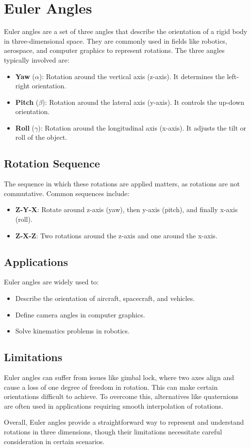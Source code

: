 \section{Euler Angles}
Euler angles are a set of three angles that describe the orientation of a rigid body in three-dimensional space. They are commonly used in fields like robotics, aerospace, and computer graphics to represent rotations. The three angles typically involved are:

\begin{itemize}
	\item \textbf{Yaw} (\(\alpha\)): Rotation around the vertical axis (z-axis). It determines the left-right orientation.
	\item \textbf{Pitch} (\(\beta\)): Rotation around the lateral axis (y-axis). It controls the up-down orientation.
	\item \textbf{Roll} (\(\gamma\)): Rotation around the longitudinal axis (x-axis). It adjusts the tilt or roll of the object.
\end{itemize}

\subsection*{Rotation Sequence}
The sequence in which these rotations are applied matters, as rotations are not commutative. Common sequences include:
\begin{itemize}
	\item \textbf{Z-Y-X}: Rotate around z-axis (yaw), then y-axis (pitch), and finally x-axis (roll).
	\item \textbf{Z-X-Z}: Two rotations around the z-axis and one around the x-axis.
\end{itemize}

\subsection*{Applications}
Euler angles are widely used to:
\begin{itemize}
	\item Describe the orientation of aircraft, spacecraft, and vehicles.
	\item Define camera angles in computer graphics.
	\item Solve kinematics problems in robotics.
\end{itemize}

\subsection*{Limitations}
Euler angles can suffer from issues like gimbal lock, where two axes align and cause a loss of one degree of freedom in rotation. This can make certain orientations difficult to achieve. To overcome this, alternatives like quaternions are often used in applications requiring smooth interpolation of rotations.

Overall, Euler angles provide a straightforward way to represent and understand rotations in three dimensions, though their limitations necessitate careful consideration in certain scenarios.
